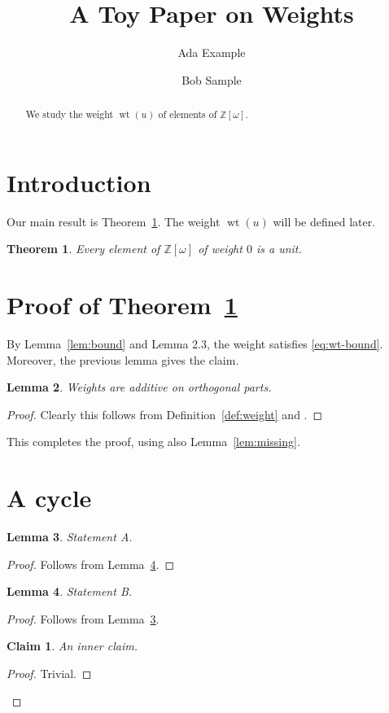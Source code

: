 \documentclass{amsart}
\title{A Toy Paper on Weights}
\author{Ada Example \and Bob Sample}
\newtheorem{theorem}{Theorem}[section]
\newtheorem{lemma}[theorem]{Lemma}
\newtheorem{claim}{Claim}
\theoremstyle{definition}
\numberwithin{equation}{section}
\newcommand{\Zw}{\mathbb{Z}[\omega]}
\newcommand{\wt}{\operatorname{wt}}
\newcommand{\lemref}[1]{Lemma~\ref{#1}}
\begin{document}
\maketitle
\begin{abstract}
We study the weight $\wt(u)$ of elements of $\Zw$.
\end{abstract}

\section{Introduction}
Our main result is Theorem~\ref{thm:main}. The weight $\wt(u)$ will be defined later.

\begin{theorem}\label{thm:main}
Every element of $\Zw$ of weight $0$ is a unit.
\end{theorem}

\section{Proof of Theorem~\ref{thm:main}}
By \lemref{lem:bound} and Lemma 2.3, the weight satisfies \eqref{eq:wt-bound}.
Moreover, the previous lemma gives the claim.
\begin{lemma}\label{lem:inner}
Weights are additive on orthogonal parts.
\end{lemma}
\begin{proof}
Clearly this follows from Definition~\ref{def:weight} and \cite[Thm.~3]{KMM}.
\end{proof}
This completes the proof, using also Lemma~\ref{lem:missing}.

\section{A cycle}
\begin{lemma}\label{lem:a}
Statement A.
\end{lemma}
\begin{proof}
Follows from Lemma~\ref{lem:b}.
\end{proof}

\begin{lemma}\label{lem:b}
Statement B.
\end{lemma}
\begin{proof}
Follows from Lemma~\ref{lem:a}.
\begin{claim}\label{cl:one}
An inner claim.
\end{claim}
\begin{proof}
Trivial.
\end{proof}
\end{proof}
\end{document}
